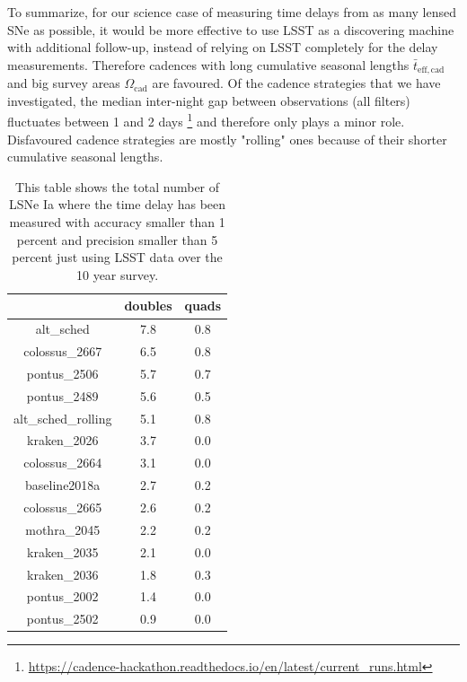 To summarize, for our science case of measuring time delays from as many lensed SNe as possible, it would be more effective to use LSST as
 a discovering machine with additional follow-up, instead of relying on LSST completely for the delay measurements. Therefore cadences with long cumulative seasonal lengths $\bar{t}_\mathrm{eff,cad}$ and big survey areas
 $\Omega_\mathrm{cad}$ are favoured. Of the cadence strategies that we have investigated, the median inter-night gap 
 between observations (all filters) fluctuates between
 1 and 2 days \footnote{\url{https://cadence-hackathon.readthedocs.io/en/latest/current_runs.html}} and
 therefore only plays a minor role. Disfavoured cadence strategies are mostly "rolling" ones because of their shorter cumulative seasonal lengths.
%
\begin{table}
\centering
\begin{tabular}{c|c|c}
& doubles & quads \\
\hline
alt\_sched & 7.8 & 0.8 \\
\hline
colossus\_2667 & 6.5 &0.8 \\
\hline
pontus\_2506 & 5.7 & 0.7 \\
\hline
pontus\_2489 & 5.6 &0.5 \\
\hline
alt\_sched\_rolling & 5.1 &0.8 \\
\hline
kraken\_2026 & 3.7 &0.0 \\
\hline
colossus\_2664 & 3.1 &0.0 \\
\hline
baseline2018a & 2.7 &0.2  \\
\hline
colossus\_2665 & 2.6 &0.2 \\
\hline
mothra\_2045 &2.2 &0.2  \\
\hline
kraken\_2035 & 2.1 &0.0  \\
\hline
kraken\_2036 & 1.8 &0.3 \\
\hline
pontus\_2002 & 1.4 &0.0 \\
\hline
pontus\_2502 & 0.9 &0.0 \\
\end{tabular}
\caption{This table shows the total number of LSNe Ia where the time
  delay has been measured with accuracy smaller than 1 percent and
  precision smaller than 5 percent just using LSST data over the 10
  year survey. }
\label{tab: total number accuracy less 1 precision less 5 percent}
\end{table}
%
